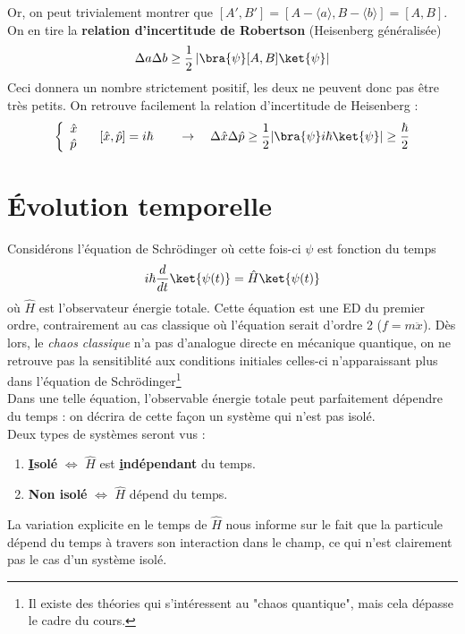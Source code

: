  Or, on peut trivialement montrer que $[A',B'] = [A-\langle a\rangle, B-\langle b\rangle]
 =[A,B]$. On en tire la \textbf{relation d'incertitude de Robertson} (Heisenberg généralisée) 
 \begin{equation}
 \Delta a \Delta b \geq \dfrac{1}{2}\left|\bra{\psi}[A,B]\ket{\psi}\right|
 \end{equation} 
 Ceci donnera un nombre strictement positif, les deux ne peuvent donc pas être très petits. 
 On retrouve facilement la relation d'incertitude de Heisenberg :
 \begin{equation}
 \left\{\begin{array}{ll}
 \hat{x}\\
 \hat{p}
 \end{array}\right.\quad [\hat{x},\hat{p}] = i\hbar\qquad\rightarrow\quad \Delta \hat{x}\Delta
 \hat{p} \geq \dfrac{1}{2}|\bra{\psi}i\hbar\ket{\psi}| \geq \dfrac{\hbar}{2}
 \end{equation}
 
\section{Évolution temporelle}
Considérons l'équation de Schrödinger où cette fois-ci $\psi$ est fonction du 
temps
\begin{equation}
i\hbar \frac{d}{dt}\ket{\psi(t)} = \hat{H}\ket{\psi(t)}
\label{eq:Cours4.1}
\end{equation}
où $\hat{H}$ est l'observateur énergie totale. Cette équation est une ED 
du premier ordre, contrairement au cas classique où l'équation 
serait d'ordre 2 ($f=m\ddot{x}$). Dès lors, le \textit{chaos classique} n'a 
pas d'analogue directe en mécanique quantique, on ne retrouve pas la sensitiblité
aux conditions initiales celles-ci n'apparaissant plus dans l'équation de 
Schrödinger\footnote{Il existe des théories qui s'intéressent au "chaos quantique", 
mais cela dépasse le cadre du cours.}\\

Dans une telle équation, l'observable énergie totale peut parfaitement 
dépendre du temps : on décrira de cette façon un système qui n'est pas isolé. \\
Deux types de systèmes seront vus :
\begin{enumerate}
\item \textbf{\underline{I}solé} $\Leftrightarrow$ $\hat{H}$ est \textbf{
\underline{i}ndépendant} du temps.
\item \textbf{Non isolé} $\Leftrightarrow$ $\hat{H}$ dépend du temps.
\end{enumerate}
La variation explicite en le temps de $\hat{H}$ nous informe sur le fait que 
la particule dépend du temps à travers son interaction dans le champ, ce qui 
n'est clairement pas le cas d'un système isolé.\\

